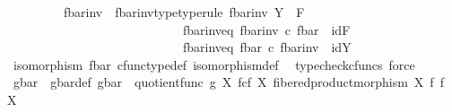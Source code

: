 \begin{isabellebody}
\isanewline
\ \ \isanewline
\ \ \isanewline
\isanewline
\ \ \isamarkupfalse%
\ f{\isacharunderscore}{\kern0pt}bar{\isacharunderscore}{\kern0pt}inv\ \ f{\isacharunderscore}{\kern0pt}bar{\isacharunderscore}{\kern0pt}inv{\isacharunderscore}{\kern0pt}type{\isacharbrackleft}{\kern0pt}type{\isacharunderscore}{\kern0pt}rule{\isacharbrackright}{\kern0pt}{\isacharcolon}{\kern0pt}\ {\isachardoublequoteopen}f{\isacharunderscore}{\kern0pt}bar{\isacharunderscore}{\kern0pt}inv{\isacharcolon}{\kern0pt}\ Y\ {\isasymrightarrow}\ F{\isachardoublequoteclose}\ \isanewline
\ \ \ \ \ \ \ \ \ \ \ \ \ \ \ \ \ \ \ \ \ \ \ \ \ \ \ \ f{\isacharunderscore}{\kern0pt}bar{\isacharunderscore}{\kern0pt}inv{\isacharunderscore}{\kern0pt}eq{}{\isacharcolon}{\kern0pt}\ {\isachardoublequoteopen}f{\isacharunderscore}{\kern0pt}bar{\isacharunderscore}{\kern0pt}inv\ {\isasymcirc}\isactrlsub c\ f{\isacharunderscore}{\kern0pt}bar\ {\isacharequal}{\kern0pt}\ id{\isacharparenleft}{\kern0pt}F{\isacharparenright}{\kern0pt}{\isachardoublequoteclose}\ \ \ \isanewline
\ \ \ \ \ \ \ \ \ \ \ \ \ \ \ \ \ \ \ \ \ \ \ \ \ \ \ \ f{\isacharunderscore}{\kern0pt}bar{\isacharunderscore}{\kern0pt}inv{\isacharunderscore}{\kern0pt}eq{}{\isacharcolon}{\kern0pt}\ {\isachardoublequoteopen}f{\isacharunderscore}{\kern0pt}bar\ {\isasymcirc}\isactrlsub c\ f{\isacharunderscore}{\kern0pt}bar{\isacharunderscore}{\kern0pt}inv\ {\isacharequal}{\kern0pt}\ id{\isacharparenleft}{\kern0pt}Y{\isacharparenright}{\kern0pt}{\isachardoublequoteclose}\isanewline
\ \ \ \ \isamarkupfalse%
\ {\isacartoucheopen}isomorphism\ f{\isacharunderscore}{\kern0pt}bar{\isacartoucheclose}\ cfunc{\isacharunderscore}{\kern0pt}type{\isacharunderscore}{\kern0pt}def\ isomorphism{\isacharunderscore}{\kern0pt}def\ \isamarkupfalse%
\ {\isacharparenleft}{\kern0pt}typecheck{\isacharunderscore}{\kern0pt}cfuncs{\isacharcomma}{\kern0pt}\ force{\isacharparenright}{\kern0pt}\isanewline
\ \ \isanewline
\ \ \isamarkupfalse%
\ g{\isacharunderscore}{\kern0pt}bar\ \ g{\isacharunderscore}{\kern0pt}bar{\isacharunderscore}{\kern0pt}def{\isacharcolon}{\kern0pt}\ {\isachardoublequoteopen}g{\isacharunderscore}{\kern0pt}bar\ {\isacharequal}{\kern0pt}\ quotient{\isacharunderscore}{\kern0pt}func\ g\ {\isacharparenleft}{\kern0pt}X\ \isactrlbsub f\isactrlesub {\isasymtimes}\isactrlsub c\isactrlbsub f\isactrlesub \ X{\isacharcomma}{\kern0pt}\ fibered{\isacharunderscore}{\kern0pt}product{\isacharunderscore}{\kern0pt}morphism\ X\ f\ f\ X{\isacharparenright}{\kern0pt}{\isachardoublequoteclose}\isanewline

\end{isabellebody}
